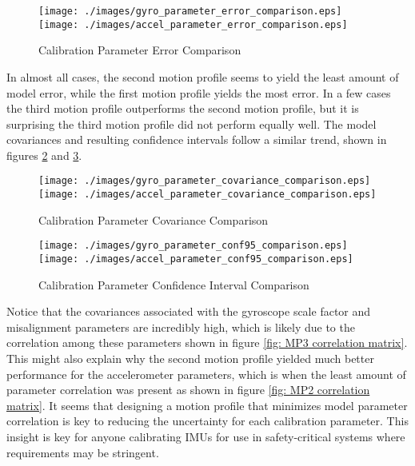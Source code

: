 \begin{figure}[!h] 
	\centering
	\texttt{[image: ./images/gyro\_parameter\_error\_comparison.eps]} \hfill
	\texttt{[image: ./images/accel\_parameter\_error\_comparison.eps]}
	\caption{Calibration Parameter Error Comparison}
	\label{fig: parameter error comparsion}
\end{figure}
\FloatBarrier

In almost all cases, the second motion profile seems to yield the least amount of model error, while the first motion profile yields the most error. In a few cases the third motion profile outperforms the second motion profile, but it is surprising the third motion profile did not perform equally well. The model covariances and resulting confidence intervals follow a similar trend, shown in figures \ref{fig: parameter covariance comparsion} and \ref{fig: parameter conf95 comparsion}. 

\begin{figure}[!h] 
	\centering
	\texttt{[image: ./images/gyro\_parameter\_covariance\_comparison.eps]} \hfill
	\texttt{[image: ./images/accel\_parameter\_covariance\_comparison.eps]}
	\caption{Calibration Parameter Covariance Comparison}
	\label{fig: parameter covariance comparsion}
\end{figure}
\FloatBarrier

\begin{figure}[!h] 
	\centering
	\texttt{[image: ./images/gyro\_parameter\_conf95\_comparison.eps]} \hfill
	\texttt{[image: ./images/accel\_parameter\_conf95\_comparison.eps]}
	\caption{Calibration Parameter Confidence Interval Comparison}
	\label{fig: parameter conf95 comparsion}
\end{figure}
\FloatBarrier

Notice that the covariances associated with the gyroscope scale factor and misalignment parameters are incredibly high, which is likely due to the correlation among these parameters shown in figure \ref{fig: MP3 correlation matrix}. This might also explain why the second motion profile yielded much better performance for the accelerometer parameters, which is when the least amount of parameter correlation was present as shown in figure \ref{fig: MP2 correlation matrix}. It seems that designing a motion profile that minimizes model parameter correlation is key to reducing the uncertainty for each calibration parameter. This insight is key for anyone calibrating IMUs for use in safety-critical systems where requirements may be stringent.


